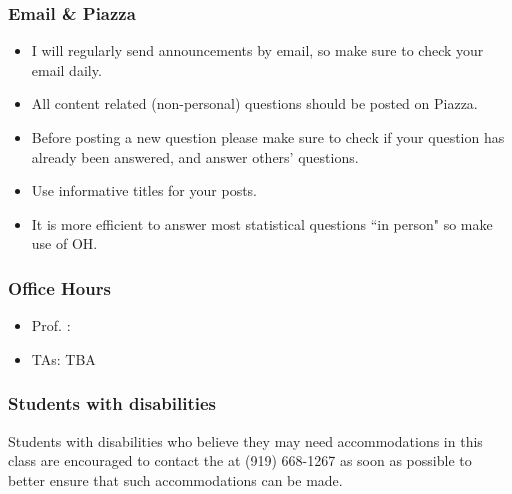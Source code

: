 \documentclass[slidestop,compress,mathserif,12pt,t,professionalfonts,xcolor=table]{beamer}
\begin{document}
\begin{frame}
\frametitle{Email \& Piazza}

\begin{itemize}

\item I will regularly send announcements by email, so make sure to check your email  
daily.

\item All content related (non-personal) questions should be posted on Piazza.

\item Before posting a new question please make sure to check if your question has 
already been answered, and answer others' questions.

\item Use informative titles for your posts.

\item It is more efficient to answer most statistical questions ``in person" so make 
use of OH.

\end{itemize}


\end{frame}


\begin{frame}
\frametitle{Office Hours}

\begin{itemize}
\item Prof. \LastName{}: \OfficeHours{}
\item TAs: TBA
\end{itemize}

\end{frame}


\begin{frame}
\frametitle{Students with disabilities}

Students with disabilities who believe they may need accommodations in this class are 
encouraged to contact the 
 at (919) 668-1267 as soon as possible to better ensure that such 
accommodations can be made.

\vfill



\end{frame}
\end{document}
